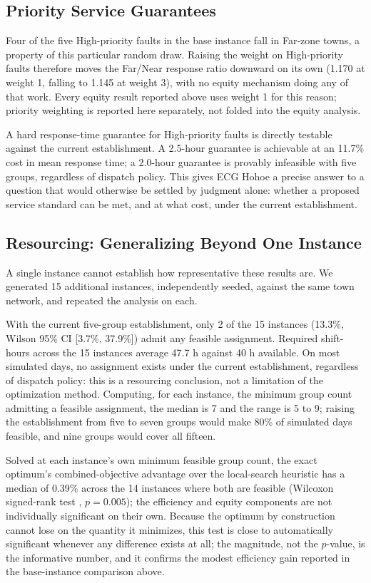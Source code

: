 \documentclass[11pt]{article}
\begin{document}
\subsection*{Priority Service Guarantees}
\label{sec:priority}

Four of the five High-priority faults in the base instance fall in Far-zone towns, a property of this particular random draw. Raising the weight on High-priority faults therefore moves the Far/Near response ratio downward on its own (1.170 at weight 1, falling to 1.145 at weight 3), with no equity mechanism doing any of that work. Every equity result reported above uses weight 1 for this reason; priority weighting is reported here separately, not folded into the equity analysis.

A hard response-time guarantee for High-priority faults is directly testable against the current establishment. A 2.5-hour guarantee is achievable at an 11.7\% cost in mean response time; a 2.0-hour guarantee is provably infeasible with five groups, regardless of dispatch policy. This gives ECG Hohoe a precise answer to a question that would otherwise be settled by judgment alone: whether a proposed service standard can be met, and at what cost, under the current establishment.

\subsection*{Resourcing: Generalizing Beyond One Instance}
\label{sec:resourcing}

A single instance cannot establish how representative these results are. We generated 15 additional instances, independently seeded, against the same town network, and repeated the analysis on each.

With the current five-group establishment, only 2 of the 15 instances (13.3\%, Wilson 95\% CI [3.7\%, 37.9\%]) admit any feasible assignment. Required shift-hours across the 15 instances average 47.7 h against 40 h available. On most simulated days, no assignment exists under the current establishment, regardless of dispatch policy: this is a resourcing conclusion, not a limitation of the optimization method. Computing, for each instance, the minimum group count admitting a feasible assignment, the median is 7 and the range is 5 to 9; raising the establishment from five to seven groups would make 80\% of simulated days feasible, and nine groups would cover all fifteen.

Solved at each instance's own minimum feasible group count, the exact optimum's combined-objective advantage over the local-search heuristic has a median of 0.39\% across the 14 instances where both are feasible (Wilcoxon signed-rank test \cite{Wilcoxon1945}, $p=0.005$); the efficiency and equity components are not individually significant on their own. Because the optimum by construction cannot lose on the quantity it minimizes, this test is close to automatically significant whenever any difference exists at all; the magnitude, not the $p$-value, is the informative number, and it confirms the modest efficiency gain reported in the base-instance comparison above.
\end{document}
